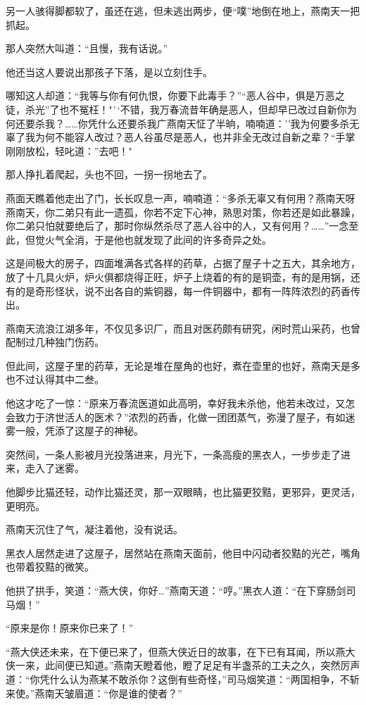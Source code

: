 \documentclass[12pt,oneside]{book}
\begin{document}
另一人骇得脚都软了，虽还在逃，但未逃出两步，便``噗''地倒在地上，燕南天一把抓起。

那人突然大叫道：``且慢，我有话说。''

他还当这人要说出那孩子下落，是以立刻住手。

哪知这人却道：``我等与你有何仇恨，你要下此毒手？''``恶人谷中，俱是万恶之徒，杀光''了也不冤枉！"``不错，我万春流昔年确是恶人，但却早已改过自新你为何还要杀我？\ldots\ldots 你凭什么还要杀我广燕南天怔了半晌，喃喃道：''我为何要多杀无辜了我为何不能容人改过？恶人谷虽尽是恶人，也并非全无改过自新之辈？``手掌刚刚放松，轻叱道：''去吧！"

那人挣扎着爬起，头也不回，一拐一拐地去了。

燕面天瞧着他走出了门，长长叹息一声，喃喃道：``多杀无辜又有何用？燕南天呀燕南天，你二弟只有此一遗孤，你若不定下心神，熟思对策，你若还是如此暴躁，你二弟只怕就要绝后了，那时你纵然杀尽了恶人谷中的人，又有何用？\ldots\ldots{}''一念至此，但觉火气全消，于是他也就发现了此间的许多奇异之处。

这是间极大的房子，四面堆满各式各样的药草，占据了屋子十之五大，其余地方，放了十几具火炉，炉火俱都烧得正旺，炉子上烧着的有的是铜壶，有的是用锅，还有的是奇形怪状，说不出各自的紫铜器，每一件铜器中，都有一阵阵浓烈的药香传出。

燕南天流浪江湖多年，不仅见多识厂，而且对医药颇有研究，闲时荒山采药，也曾配制过几种独门伤药。

但此间，这屋子里的药草，无论是堆在屋角的也好，煮在壶里的也好，燕南天是多也不过认得其中二叁。

他这才吃了一惊：``原来万春流医道如此高明，幸好我未杀他，他若未改过，又怎会致力于济世活人的医术？''浓烈的药香，化做一团团蒸气，弥漫了屋子，有如迷雾一般，凭添了这屋子的神秘。

突然间，一条人影被月光投落进来，月光下，一条高瘦的黑衣人，一步步走了进来，走入了迷雾。

他脚步比猫还轻，动作比猫还灵，那一双眼睛，也比猫更狡黠，更邪异，更灵活，更明亮。

燕南天沉住了气，凝注着他，没有说话。

黑衣人居然走进了这屋子，居然站在燕南天面前，他目中闪动者狡黠的光芒，嘴角也带着狡黠的微笑。

他拱了拱手，笑道：``燕大侠，你好\ldots{}''燕南天道：``哼。''黑衣人道：``在下穿肠剑司马烟！''

``原来是你！原来你已来了！''

``燕大侠还未来，在下便已来了，但燕大侠近日的故事，在下已有耳闻，所以燕大侠一来，此间便已知道。''燕南天瞪着他，瞪了足足有半盏茶的工夫之久，突然厉声道：``你凭什么认为燕某不敢杀你？这倒有些奇怪，''司马烟笑道：``两国相争，不斩来使。''燕南天皱眉道：``你是谁的使者？''
\end{document}
